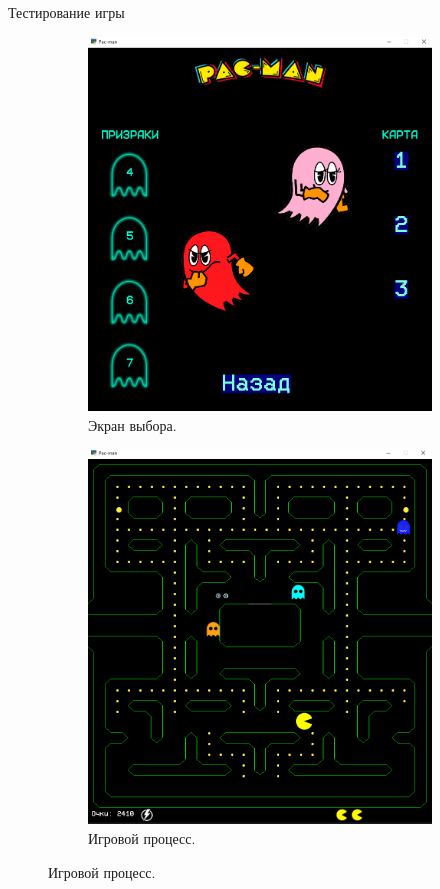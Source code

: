 \documentclass[10pt,a4paper,mathserif]{beamer}
\begin{document}
\begin{frame}{Тестирование игры}
    \begin{figure}
    \centering
    \begin{subfigure}{.5\textwidth}
      \centering
      \includegraphics[width=.8\linewidth]{src/3.png}
      \caption{Экран выбора.}
    \end{subfigure}%
    \begin{subfigure}{.5\textwidth}
      \centering
      \includegraphics[width=.8\linewidth]{src/5.png}
      \caption{Игровой процесс.}
    \end{subfigure}
    \end{figure}
\end{frame}
\end{document}

